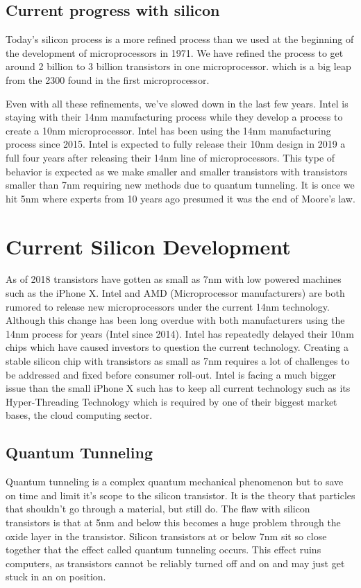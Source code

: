 \documentclass[journal]{IEEEtran}
\begin{document}
\subsection{Current progress with silicon}
Today's silicon process is a more refined process than we used at the beginning of the development of microprocessors in 1971. We have refined the process to get around 2 billion to 3 billion transistors in one microprocessor. which is a big leap from the 2300 found in the first microprocessor.

Even with all these refinements, we've slowed down in the last few years. Intel is staying with their 14nm manufacturing process while they develop a process to create a 10nm microprocessor. Intel has been using the 14nm manufacturing process since 2015. Intel is expected to fully release their 10nm design in 2019 a full four years after releasing their 14nm line of microprocessors. This type of behavior is expected as we make smaller and smaller transistors with transistors smaller than 7nm requiring new methods due to quantum tunneling. It is once we hit 5nm where experts from 10 years ago presumed it was the end of Moore's law. \cite{591665}

\section{Current Silicon Development}
As of 2018 transistors have gotten as small as 7nm with low powered machines such as the iPhone X. Intel and AMD (Microprocessor manufacturers) are both rumored to release new microprocessors under the current 14nm technology. Although this change has been long overdue with both manufacturers using the 14nm process for years (Intel since 2014). Intel has repeatedly delayed their 10nm chips \cite{dent_2018} which have caused investors to question the current technology. Creating a stable silicon chip with transistors as small as 7nm requires a lot of challenges to be addressed and fixed before consumer roll-out. Intel is facing a much bigger issue than the small iPhone X such has to keep all current technology such as its Hyper-Threading Technology which is required by one of their biggest market bases, the cloud computing sector. 

\subsection{Quantum Tunneling}
Quantum tunneling is a complex quantum mechanical phenomenon \cite{70394920140101} but to save on time and limit it's scope to the silicon transistor. It is the theory that particles that shouldn't go through a material, but still do. The flaw with silicon transistors is that at 5nm and below this becomes a huge problem through the oxide layer in the transistor. Silicon transistors at or below 7nm sit so close together that the effect called quantum tunneling occurs. This effect ruins computers, as transistors cannot be reliably turned off and on and may just get stuck in an on position.
\end{document}
